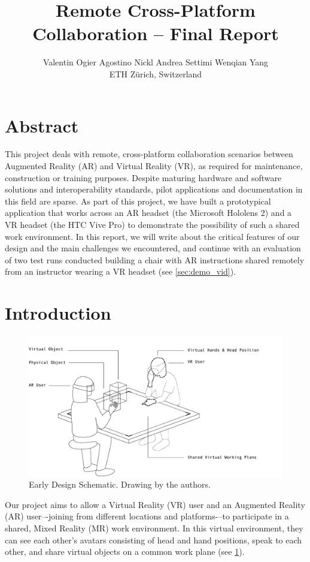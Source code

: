 \documentclass[10pt,twocolumn,letterpaper,english]{article}
\title{Remote Cross-Platform Collaboration -- Final Report}
\author{Valentin Ogier \qquad Agostino Nickl \qquad Andrea Settimi \qquad Wenqian Yang \\ ETH Zürich, Switzerland}
\begin{document}
\maketitle

\section{Abstract}

This project deals with remote, cross-platform collaboration scenarios between Augmented Reality (AR) and Virtual Reality (VR), as required for maintenance, construction or training purposes. Despite maturing hardware and software solutions and interoperability standards, pilot applications and documentation in this field are sparse. As part of this project, we have built a prototypical application that works across an AR headset (the Microsoft Hololens 2) and a VR headset (the HTC Vive Pro) to demonstrate the possibility of such a shared work environment. In this report, we will write about the critical features of our design and the main challenges we encountered, and continue with an evaluation of two test runs conducted building a chair with AR instructions shared remotely from an instructor wearing a VR headset (see \cref{sec:demo_vid}).

\section{Introduction}

\begin{figure}[!htp]
    \centering
    \includegraphics[width=1\linewidth]{VR_20Proposal.png}
    \caption{Early Design Schematic. Drawing by the authors.}
    \label{fig:Vr Proposal}
\end{figure}

Our project aims to allow a Virtual Reality (VR) user and an Augmented Reality (AR) user–-joining from different locations and platforms-–to participate in a shared, Mixed Reality (MR) work environment. In this virtual environment, they can see each other's avatars consisting of head and hand positions, speak to each other, and share virtual objects on a common work plane (see \cref{fig:Vr Proposal}). 
\end{document}
